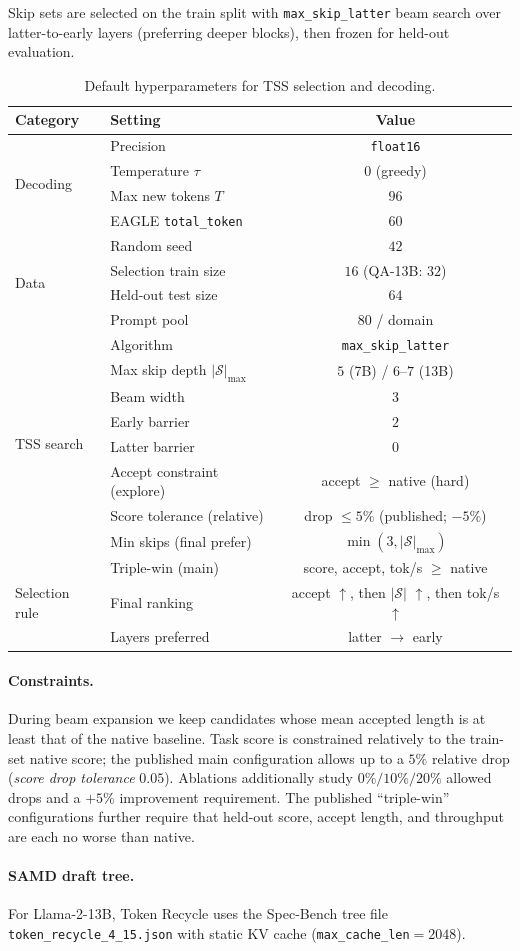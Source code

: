 Skip sets are selected on the train split with \texttt{max\_skip\_latter} beam search over latter-to-early layers (preferring deeper blocks), then frozen for held-out evaluation.

\begin{table}[t]
\centering
\small
\caption{Default hyperparameters for TSS selection and decoding.}
\label{tab:hparams}
\setlength{\tabcolsep}{4pt}
\begin{tabular}{llc}
\toprule
Category & Setting & Value \\
\midrule
\multirow{4}{*}{Decoding}
  & Precision & \texttt{float16} \\
  & Temperature $\tau$ & $0$ (greedy) \\
  & Max new tokens $T$ & $96$ \\
  & EAGLE \texttt{total\_token} & $60$ \\
\midrule
\multirow{4}{*}{Data}
  & Random seed & $42$ \\
  & Selection train size & $16$ (QA-13B: $32$) \\
  & Held-out test size & $64$ \\
  & Prompt pool & $80$ / domain \\
\midrule
\multirow{8}{*}{TSS search}
  & Algorithm & \texttt{max\_skip\_latter} \\
  & Max skip depth $|\mathcal{S}|_{\max}$ & $5$ (7B) / $6$--$7$ (13B) \\
  & Beam width & $3$ \\
  & Early barrier & $2$ \\
  & Latter barrier & $0$ \\
  & Accept constraint (explore) & accept $\ge$ native (hard) \\
  & Score tolerance (relative) & drop $\le 5\%$ (published; $-5\%$) \\
  & Min skips (final prefer) & $\min(3,|\mathcal{S}|_{\max})$ \\
\midrule
\multirow{3}{*}{Selection rule}
  & Triple-win (main) & score, accept, tok/s $\ge$ native \\
  & Final ranking & accept $\uparrow$, then $|\mathcal{S}|$ $\uparrow$, then tok/s $\uparrow$ \\
  & Layers preferred & latter $\rightarrow$ early \\
\bottomrule
\end{tabular}
\end{table}

\paragraph{Constraints.}
During beam expansion we keep candidates whose mean accepted length is at least that of the native baseline.
Task score is constrained relatively to the train-set native score; the published main configuration allows up to a $5\%$ relative drop (\emph{score drop tolerance} $0.05$).
Ablations additionally study $0\%/10\%/20\%$ allowed drops and a $+5\%$ improvement requirement.
The published ``triple-win'' configurations further require that held-out score, accept length, and throughput are each no worse than native.

\paragraph{SAMD draft tree.}
For Llama-2-13B, Token Recycle uses the Spec-Bench tree file \texttt{token\_recycle\_4\_15.json} with static KV cache (\texttt{max\_cache\_len}${=}2048$).
